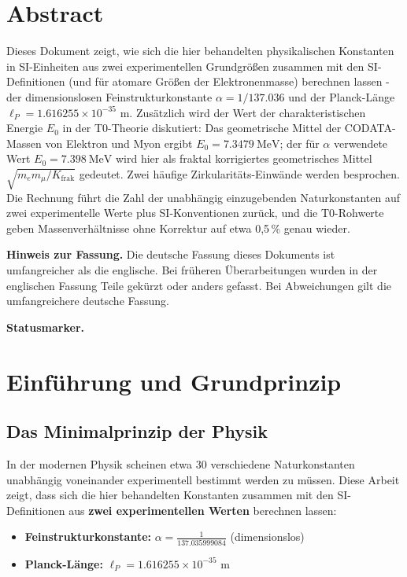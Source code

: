 \section*{Abstract}
		Dieses Dokument zeigt, wie sich die hier behandelten physikalischen Konstanten in SI-Einheiten aus zwei experimentellen Grundgröß{}en zusammen mit den SI-Definitionen (und für atomare Größ{}en der Elektronenmasse) berechnen lassen - der dimensionslosen Feinstrukturkonstante $\alpha = 1/137.036$ und der Planck-Länge $\ell_P = 1.616255 \times 10^{-35}$ m. Zusätzlich wird der Wert der charakteristischen Energie $E_0$ in der T0-Theorie diskutiert: Das geometrische Mittel der CODATA-Massen von Elektron und Myon ergibt $E_0 = \SI{7.3479}{\MeV}$; der für $\alpha$ verwendete Wert $E_0 = \SI{7.398}{\MeV}$ wird hier als fraktal korrigiertes geometrisches Mittel $\sqrt{m_e m_\mu/K_{\text{frak}}}$ gedeutet. Zwei häufige Zirkularitäts-Einwände werden besprochen. Die Rechnung führt die Zahl der unabhängig einzugebenden Naturkonstanten auf zwei experimentelle Werte plus SI-Konventionen zurück, und die T0-Rohwerte geben Massenverhältnisse ohne Korrektur auf etwa 0,5\,\% genau wieder.

	\medskip\noindent\textbf{Hinweis zur Fassung.} Die deutsche Fassung dieses Dokuments ist umfangreicher als die englische. Bei früheren Überarbeitungen wurden in der englischen Fassung Teile gekürzt oder anders gefasst. Bei Abweichungen gilt die umfangreichere deutsche Fassung.


	\medskip\noindent\textbf{Statusmarker.}
	

	
	
	\section{Einführung und Grundprinzip}
	
	\subsection{Das Minimalprinzip der Physik}
	
	In der modernen Physik scheinen etwa 30 verschiedene Naturkonstanten unabhängig voneinander experimentell bestimmt werden zu müssen. Diese Arbeit zeigt, dass sich die hier behandelten Konstanten zusammen mit den SI-Definitionen aus \textbf{zwei experimentellen Werten} berechnen lassen:
	
	\begin{tcolorbox}[colback=blue!5!white,colframe=blue!75!black,title=Fundamentale Eingangsdaten]
		\begin{itemize}
			\item \textbf{Feinstrukturkonstante:} $\alpha = \frac{1}{137.035999084}$ (dimensionslos)
			\item \textbf{Planck-Länge:} $\ell_P = 1.616255 \times 10^{-35}$ \si{\meter}
		\end{itemize}
	\end{tcolorbox}
	
